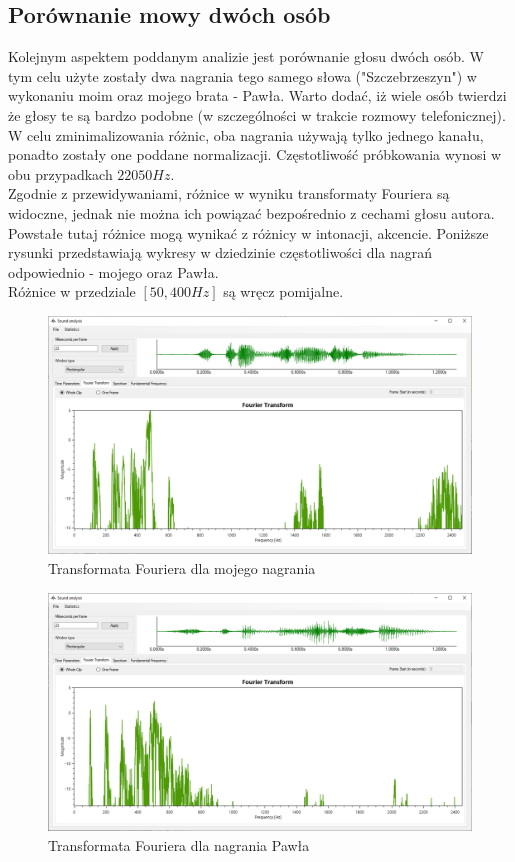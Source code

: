 \documentclass[a4paper]{article}
\begin{document}
\subsection{Porównanie mowy dwóch osób}
Kolejnym aspektem poddanym analizie jest porównanie głosu dwóch osób. W tym celu użyte zostały dwa nagrania tego samego słowa ("Szczebrzeszyn") w wykonaniu moim oraz mojego brata - Pawła. Warto dodać, iż wiele osób twierdzi że głosy te są bardzo podobne (w szczególności w trakcie rozmowy telefonicznej).\\
W celu zminimalizowania różnic, oba nagrania używają tylko jednego kanału, ponadto zostały one poddane normalizacji. Częstotliwość próbkowania wynosi w obu przypadkach $22050 Hz$.\\
Zgodnie z przewidywaniami, różnice w wyniku transformaty Fouriera są widoczne, jednak nie można ich powiązać bezpośrednio z cechami głosu autora. Powstałe tutaj różnice mogą wynikać z różnicy w intonacji, akcencie. Poniższe rysunki przedstawiają wykresy w dziedzinie częstotliwości dla nagrań odpowiednio - mojego oraz Pawła.\\
Różnice w przedziale $[50, 400 Hz]$ są wręcz pomijalne.
\begin{figure}[H]
  \centering
  \includegraphics[width=0.86\linewidth]{images/10fourierMy.png}
  \caption{Transformata Fouriera dla mojego nagrania}
\end{figure}
\begin{figure}[H]
  \centering
  \includegraphics[width=0.86\linewidth]{images/11fourierBro.png}
  \caption{Transformata Fouriera dla nagrania Pawła}
\end{figure}
\end{document}
